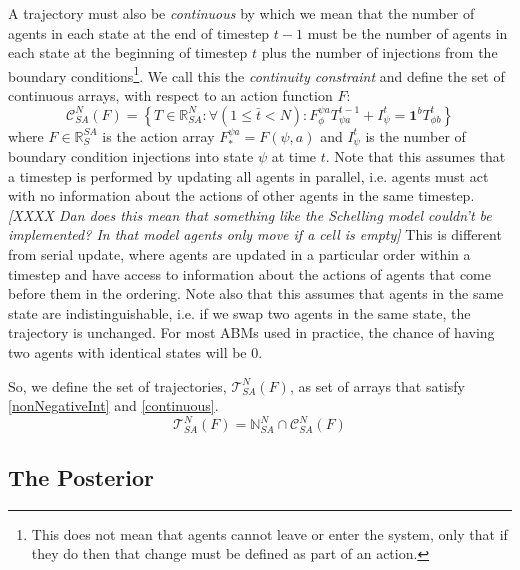 \documentclass{article}
\begin{document}
A trajectory must also be \textit{continuous} by which we mean that the number of agents in each state at the end of timestep $t-1$ must be the number of agents in each state at the beginning of timestep $t$ plus the number of injections from the boundary conditions\footnote{This does not mean that agents cannot leave or enter the system, only that if they do then that change must be defined as part of an action.}. We call this the \textit{continuity constraint} and define the set of continuous arrays, with respect to an action function $F$:
\begin{equation}
\mathcal{C}^N_{SA}(F) = \left\{T\in\mathbb{R}^N_{SA}:  \forall \left(  1 \le \bar t < N\right): F^{\psi a}_{\phi} T^{t-1}_{\psi a} + I^t_\psi = \mathbf{1}^bT^{t}_{\phi b} \right\}
\label{continuous}
\end{equation}
where $F \in \mathbb{R}^{SA}_S$ is the action array $F^{\psi a}_* = F(\psi, a)$ and $I^t_\psi$ is the number of boundary condition injections into state $\psi$ at time $t$. Note that this assumes that a timestep is performed by updating all agents in parallel, i.e. agents must act with no information about the actions of other agents in the same timestep. \textit{[XXXX Dan does this mean that something like the Schelling model couldn't be implemented? In that model agents only move if a cell is empty]} This is different from serial update, where agents are updated in a particular order within a timestep and have access to information about the actions of agents that come before them in the ordering. Note also that this assumes that agents in the same state are indistinguishable, i.e. if we swap two agents in the same state, the trajectory is unchanged. For most ABMs used in practice, the chance of having two agents with identical states will be $0$.


So, we define the set of trajectories, $\mathcal{T}^N_{SA}(F)$, as set of arrays that satisfy \eqref{nonNegativeInt} and \eqref{continuous}.
\begin{equation}
\mathcal{T}^N_{SA}(F) = \mathbb{N}^N_{SA} \cap \mathcal{C}^N_{SA}(F)
\label{SetOfTrajectories}
\end{equation}


\subsection{The Posterior}
\end{document}
